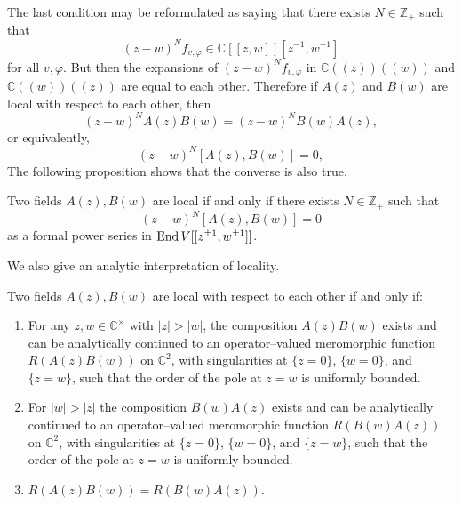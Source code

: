 \documentclass[12pt]{article}
\begin{document}
The last condition may be reformulated as saying that there exists
$N \in \mathbb{Z}_+$ such that
\[
    (z-w)^N f_{v,\varphi} \in \mathbb{C}[[z,w]][z^{-1},w^{-1}]
\]
for all $v,\varphi$. But then the expansions of $(z-w)^N f_{v,\varphi}$ in 
$\mathbb{C}((z))((w))$ and $\mathbb{C}((w))((z))$ are equal to each other. 
Therefore if $A(z)$ and $B(w)$ are local with respect to each other, then
\[
    (z-w)^N A(z)B(w) = (z-w)^N B(w)A(z),
\]
or equivalently,
\[
    (z-w)^N [A(z),B(w)] = 0,
\]
The following proposition shows that the converse is also true.

\begin{proposition}
Two fields $A(z),B(w)$ are local if and only if there exists
$N \in \mathbb{Z}_+$ such that
\begin{equation}\label{eq:locality}
    (z-w)^N [A(z),B(w)] = 0
\end{equation}
as a formal power series in $\operatorname{End} V[[z^{\pm1},w^{\pm1}]]$.
\end{proposition}

We also give an analytic interpretation of locality.
\begin{proposition}
Two fields $A(z),B(w)$ are local with respect to each other
if and only if:
\begin{enumerate}
    \item For any $z,w \in \mathbb{C}^\times$ with $|z| > |w|$, 
    the composition $A(z)B(w)$ exists and can be analytically 
    continued to an operator–valued meromorphic function 
    $R(A(z)B(w))$ on $\mathbb{C}^2$, with singularities at 
    $\{z=0\}$, $\{w=0\}$, and $\{z=w\}$, such that the order 
    of the pole at $z=w$ is uniformly bounded.

    \item For $|w| > |z|$ the composition $B(w)A(z)$ exists and can 
    be analytically continued to an operator–valued meromorphic 
    function $R(B(w)A(z))$ on $\mathbb{C}^2$, with singularities 
    at $\{z=0\}$, $\{w=0\}$, and $\{z=w\}$, such that the order 
    of the pole at $z=w$ is uniformly bounded.

    \item $R(A(z)B(w)) = R(B(w)A(z))$.
\end{enumerate}
\end{proposition}
\end{document}
